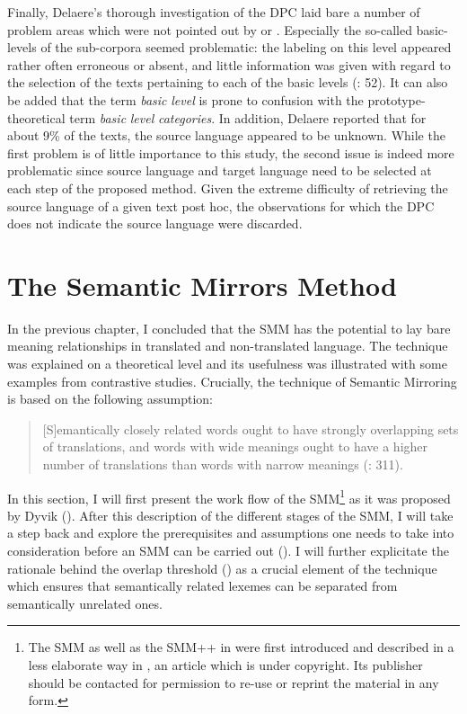 Finally, Delaere’s thorough investigation of the DPC laid bare a number of problem areas which were not pointed out by \citet{spyns_dutch_2013} or \citet{macken_dutch_2011}. Especially the so-called basic-levels of the sub-corpora seemed problematic: the labeling on this level appeared rather often erroneous or absent, and little information was given with regard to the selection of the texts pertaining to each of the basic levels (\citealt{delaere_translations_2015}: 52). It can also be added that the term \textit{basic} \textit{level} is prone to confusion with the prototype-theoretical term \textit{basic} \textit{level} \textit{categories}. In addition, Delaere reported that for about 9\% of the texts, the source language appeared to be unknown. While the first problem is of little importance to this study, the second issue is indeed more problematic since source language and target language need to be selected at each step of the proposed method. Given the extreme difficulty of retrieving the source language of a given text post hoc, the observations for which the DPC does not indicate the source language were discarded.


\section{\label{sec:3.4}  The Semantic Mirrors Method}

In the previous chapter, I concluded that the SMM has the potential to lay bare meaning relationships in translated and non-translated language. The technique was explained on a theoretical level and its usefulness was illustrated with some examples from contrastive studies. Crucially, the technique of Semantic Mirroring is based on the following assumption:


\begin{quote}
[S]emantically closely related words ought to have strongly overlapping sets of translations, and words with wide meanings ought to have a higher number of translations than words with narrow meanings (\citealt{aijmer_translations_2004}: 311).
\end{quote}


In this section, I will first present the work flow of the SMM\footnote{The SMM as well as the SMM++ in  were first introduced and described in a less elaborate way in \citet{vandevoorde_corpus-based_2017}, an article which is under copyright. Its publisher should be contacted for permission to re-use or reprint the material in any form.} as it was proposed by Dyvik (). After this description of the different stages of the SMM, I will take a step back and explore the prerequisites and assumptions one needs to take into consideration before an SMM can be carried out (). I will further explicitate the rationale behind the overlap threshold () as a crucial element of the technique which ensures that semantically related lexemes can be separated from semantically unrelated ones.


